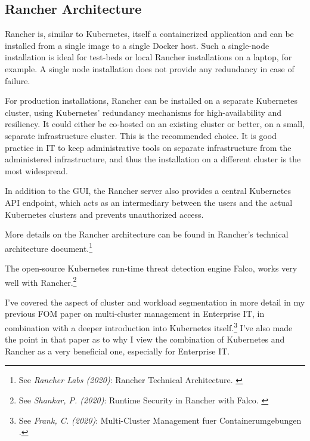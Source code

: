 \subsection{Rancher Architecture}

Rancher is, similar to Kubernetes, itself a containerized application and can be installed from a single image to a single Docker host. Such a single-node installation is ideal for test-beds or local Rancher installations on a laptop, for example. A single node installation does not provide any redundancy in case of failure.

For production installations, Rancher can be installed on a separate Kubernetes cluster, using Kubernetes' redundancy mechanisms for high-availability and resiliency. It could either be co-hosted on an existing cluster or better, on a small, separate infrastructure cluster. This is the recommended choice. It is good practice in IT to keep administrative tools on separate infrastructure from the administered infrastructure, and thus the installation on a different cluster is the most widespread.

In addition to the GUI, the Rancher server also provides a central Kubernetes API endpoint, which acts as an intermediary between the users and the actual Kubernetes clusters and prevents unauthorized access.

More details on the Rancher architecture can be found in Rancher's technical architecture document.\footnote{See \textit{Rancher Labs (2020)}: Rancher Technical Architecture. \cite{technicalArchitecture}}

The open-source Kubernetes run-time threat detection engine Falco, works very well with Rancher.\footnote{See \textit{Shankar, P. (2020)}: Runtime Security in Rancher with Falco. \cite{falcoPsp}}

I've covered the aspect of cluster and workload segmentation in more detail in my previous FOM paper on multi-cluster management in Enterprise IT, in combination with a deeper introduction into Kubernetes itself.\footnote{See \textit{Frank, C. (2020)}: Multi-Cluster Management fuer Containerumgebungen .\cite{previousPaper}} I've also made the point in that paper as to why I view the combination of Kubernetes and Rancher as a very beneficial one, especially for Enterprise IT.
